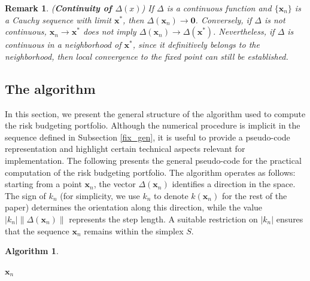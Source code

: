 \documentclass[preprint,11pt,authoryear]{elsarticle}
\newtheorem{remark}{Remark}%
\newtheorem{algorithm}{Algorithm}
\begin{document}
\begin{remark}(\textbf{Continuity of $\Delta(x)$})
If $\Delta$ is a continuous function and $\{\mathbf{x}_n\}$ is a Cauchy sequence with limit $\mathbf{x}^*$, then $\Delta(\mathbf{x}_n)\rightarrow \mathbf{0}$. Conversely, if $\Delta$ is not continuous, $\mathbf{x}_n\rightarrow \mathbf{x}^*$ does not imply $\Delta(\mathbf{x}_n)\rightarrow \Delta(\mathbf{x}^*)$. Nevertheless, if $\Delta$ is continuous in a neighborhood of $\mathbf{x}^*$, since it definitively belongs to the neighborhood, then local convergence to the fixed point can still be established.  
\end{remark}

\subsection{The algorithm}\label{algo}

In this section, we present the general structure of the algorithm used to compute the risk budgeting portfolio. Although the numerical procedure is implicit in the sequence defined in Subsection \ref{fix_gen}, it is useful to provide a pseudo-code representation and highlight certain technical aspects relevant for implementation. The following presents the general pseudo-code for the practical computation of the risk budgeting portfolio. 
The algorithm operates as follows: starting from a point $\mathbf{x}_n$, the vector $\Delta(\mathbf x_n)$ identifies a direction in the space. The sign of $k_n$ (for simplicity, we use $k_n$ to denote $k(\mathbf x_n)$ for the rest of the paper) determines the orientation along this direction, while the value $|k_n| \|\Delta(\mathbf x_n) \|$ represents the step length. A suitable restriction on $|k_n|$ ensures that the sequence $\mathbf{x}_n$ remains within the simplex $S$.

\begin{algorithm}
\label{algo_gen}
\begin{algorithmic}
\ENDIF
{}
\ENDIF
{}
\ENDWHILE
\RETURN $\mathbf{x}_{n}$
\end{algorithmic}
\end{algorithm}
\end{document}
